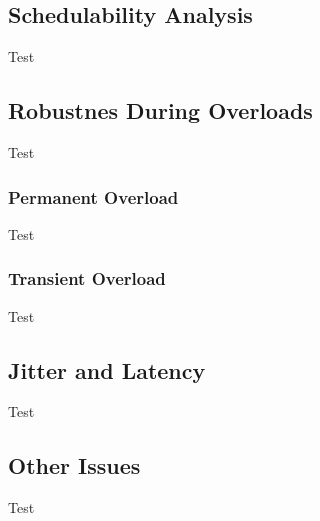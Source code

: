 \subsection{Schedulability Analysis}
\begin{frame}{\subsecname}
	Test
\end{frame}

\subsection{Robustnes During Overloads}
\begin{frame}{\subsecname}
	Test
\end{frame}

\subsubsection{Permanent Overload}
\begin{frame}{\subsecname}
	Test
\end{frame}

\subsubsection{Transient Overload}
\begin{frame}{\subsecname}
	Test
\end{frame}

\subsection{Jitter and Latency}
\begin{frame}{\subsecname}
	Test
\end{frame}

\subsection{Other Issues}
\begin{frame}{\subsecname}
	Test
\end{frame}